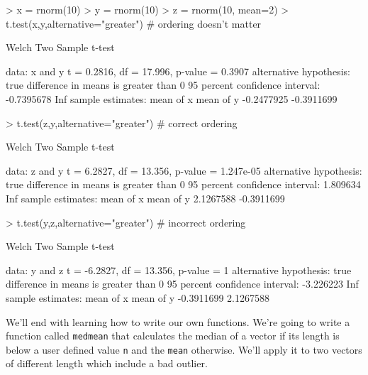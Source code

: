 \documentclass[12pt]{article}
\newcommand{\code}[1]{{\texttt{#1}}}
\begin{document}
\begin{Schunk}
\begin{Sinput}
> x = rnorm(10)
> y = rnorm(10)
> z = rnorm(10, mean=2)
> t.test(x,y,alternative="greater") # ordering doesn't matter
\end{Sinput}
\begin{Soutput}
	Welch Two Sample t-test

data:  x and y
t = 0.2816, df = 17.996, p-value = 0.3907
alternative hypothesis: true difference in means is greater than 0
95 percent confidence interval:
 -0.7395678        Inf
sample estimates:
 mean of x  mean of y 
-0.2477925 -0.3911699 
\end{Soutput}
\begin{Sinput}
> t.test(z,y,alternative="greater") # correct ordering
\end{Sinput}
\begin{Soutput}
	Welch Two Sample t-test

data:  z and y
t = 6.2827, df = 13.356, p-value = 1.247e-05
alternative hypothesis: true difference in means is greater than 0
95 percent confidence interval:
 1.809634      Inf
sample estimates:
 mean of x  mean of y 
 2.1267588 -0.3911699 
\end{Soutput}
\begin{Sinput}
> t.test(y,z,alternative="greater") # incorrect ordering
\end{Sinput}
\begin{Soutput}
	Welch Two Sample t-test

data:  y and z
t = -6.2827, df = 13.356, p-value = 1
alternative hypothesis: true difference in means is greater than 0
95 percent confidence interval:
 -3.226223       Inf
sample estimates:
 mean of x  mean of y 
-0.3911699  2.1267588 
\end{Soutput}
\end{Schunk}

We'll end with learning how to write our own functions.  We're going to write a function called \code{medmean} that calculates the median of a vector if its length is below a user defined value \code{n} and the \code{mean} otherwise.  We'll apply it to two vectors of different length which include a bad outlier.
\end{document}
